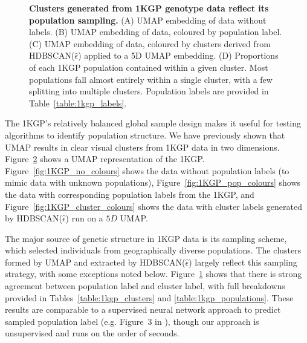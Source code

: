 \begin{figure}[!ht]
\begin{subfigure}[b]{0.49\linewidth}
    \caption{}
    \label{fig:1KGP_heatmap}
  \end{subfigure}
  \caption[Clusters generated from 1KGP genotype data reflect its population sampling]{\textbf{Clusters generated from 1KGP genotype data reflect its population sampling.} (A) UMAP embedding of data without labels. (B) UMAP embedding of data, coloured by population label. (C) UMAP embedding of data, coloured by clusters derived from HDBSCAN($\hat{\epsilon}$) applied to a 5D UMAP embedding. (D) Proportions of each 1KGP population contained within a given cluster. Most populations fall almost entirely within a single cluster, with a few splitting into multiple clusters. Population labels are provided in Table~\ref{table:1kgp_labels}.}
  \label{fig:1000GP}
\end{figure}

\clearpage

The 1KGP's relatively balanced global sample design makes it useful for testing algorithms to identify population structure. We have previously shown that UMAP results in clear visual clusters from 1KGP data in two dimensions\citep{diaz-papkovich_umap_2019}. Figure~\ref{fig:1000GP} shows a UMAP representation of the 1KGP. Figure~\ref{fig:1KGP_no_colours} shows the data without population labels (to mimic data with unknown populations), Figure~\ref{fig:1KGP_pop_colours} shows the data with corresponding population labels from the 1KGP, and Figure~\ref{fig:1KGP_cluster_colours} shows the data with cluster labels generated by HDBSCAN($\hat{\epsilon}$) run on a $5D$ UMAP.

The major source of genetic structure in 1KGP data is its sampling scheme, which selected individuals from geographically diverse populations. The clusters formed by UMAP and extracted by HDBSCAN($\hat{\epsilon}$) largely reflect this sampling strategy, with some exceptions noted below. Figure~\ref{fig:1KGP_heatmap} shows that there is strong agreement between population label and cluster label, with full breakdowns provided in Tables~\ref{table:1kgp_clusters} and \ref{table:1kgp_populations}. These results are comparable to a supervised neural network approach to predict sampled population label (e.g. Figure~3 in \citep{romero_diet_2017}), though our approach is unsupervised and runs on the order of seconds.

\clearpage

